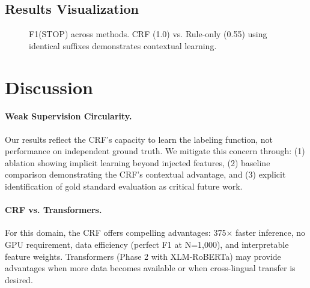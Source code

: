 \documentclass[11pt,a4paper]{article}
\begin{document}
\subsection{Results Visualization}

\begin{figure}[t]
\centering
{}
\caption{F1(STOP) across methods. CRF (1.0) vs. Rule-only (0.55) using identical suffixes demonstrates contextual learning.}
\label{fig:f1-comparison}
\end{figure}

\section{Discussion}

\paragraph{Weak Supervision Circularity.} Our results reflect the CRF's capacity to learn the labeling function, not performance on independent ground truth. We mitigate this concern through: (1) ablation showing implicit learning beyond injected features, (2) baseline comparison demonstrating the CRF's contextual advantage, and (3) explicit identification of gold standard evaluation as critical future work.

\paragraph{CRF vs. Transformers.} For this domain, the CRF offers compelling advantages: 375$\times$ faster inference, no GPU requirement, data efficiency (perfect F1 at N=1,000), and interpretable feature weights. Transformers (Phase 2 with XLM-RoBERTa) may provide advantages when more data becomes available or when cross-lingual transfer is desired.
\end{document}
